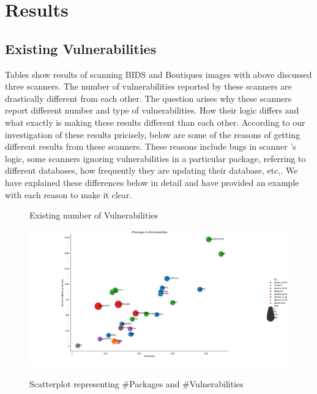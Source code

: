 \documentclass[a4paper,num-refs]{oup-contemporary}
\begin{document}
\section{Results}

\subsection{Existing Vulnerabilities}

Tables show results of scanning BIDS and Boutiques images with above discussed three scanners.
The number of vulnerabilities reported by these scanners are drastically different from each other.
The question arises why these scanners report different number and type of vulnerabilities.
How their logic differs and what exactly is making these results different than each other.
According to our investigation of these results pricisely, below are some of the reasons of
getting different results from these scanners. These reasons include bugs in scanner 's logic,
some scanners ignoring vulnerabilities in a particular package, referring to different databases,
how frequently they are updating their database, etc,. We have explained these differences below in detail
and have provided an example with each reason to make it clear.

\begin{figure}
%
       \centering
        \caption{Existing number of Vulnerabilities}
\end{figure}

\begin{figure}[!htb]
        {\includegraphics[width=\columnwidth]
        {Figures/vulngraph.png}}
        \caption{\label{fig:graph1} Scatterplot representing \#Packages and \#Vulnerabilities}
      \end{figure}
\end{document}
